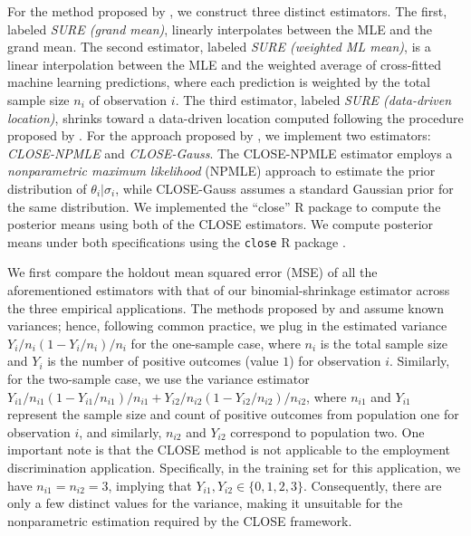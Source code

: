 \documentclass[12pt,letterpaper]{article}
\begin{document}
For the method proposed by \citet{xie2012sure}, we construct three distinct estimators. The first, labeled \textit{SURE (grand mean)}, linearly interpolates between the MLE and the grand mean. The second estimator, labeled \textit{SURE (weighted ML mean)}, is a linear interpolation between the MLE and the weighted average of cross-fitted machine learning predictions, where each prediction is weighted by the total sample size $n_i$ of observation $i$. The third estimator, labeled \textit{SURE (data-driven location)}, shrinks toward a data-driven location computed following the procedure proposed by \citet{xie2012sure}. For the approach proposed by \citet{chen2022empirical}, we implement two estimators: \textit{CLOSE-NPMLE} and \textit{CLOSE-Gauss}. The CLOSE-NPMLE estimator employs a \textit{nonparametric maximum likelihood} (NPMLE) approach to estimate the prior distribution of $\theta_i|\sigma_i$, while CLOSE-Gauss assumes a standard Gaussian prior for the same distribution. We implemented the ``close'' R package to compute the posterior means using both of the CLOSE estimators. We compute posterior means under both specifications using the \texttt{close} R package \citep{closeRpackage}.

We first compare the holdout mean squared error (MSE) of all the aforementioned estimators with that of our binomial-shrinkage estimator across the three empirical applications. The methods proposed by \citet{xie2012sure} and \citet{chen2022empirical} assume known variances; hence, following common practice, we plug in the estimated variance $Y_i/n_i(1 - Y_i/n_i)/n_i$ for the one-sample case, where $n_i$ is the total sample size and $Y_i$ is the number of positive outcomes (value $1$) for observation $i$. Similarly, for the two-sample case, we use the variance estimator $Y_{i1}/n_{i1}(1-Y_{i1}/n_{i1})/n_{i1}+Y_{i2}/n_{i2}(1-Y_{i2}/n_{i2})/n_{i2}$, where $n_{i1}$ and $Y_{i1}$ represent the sample size and count of positive outcomes from population one for observation $i$, and similarly, $n_{i2}$ and $Y_{i2}$ correspond to population two. One important note is that the CLOSE method is not applicable to the employment discrimination application. Specifically, in the training set for this application, we have $n_{i1}=n_{i2}=3$, implying that $Y_{i1}, Y_{i2}\in\{0,1,2,3\}$. Consequently, there are only a few distinct values for the variance, making it unsuitable for the nonparametric estimation required by the CLOSE framework. 
\end{document}
